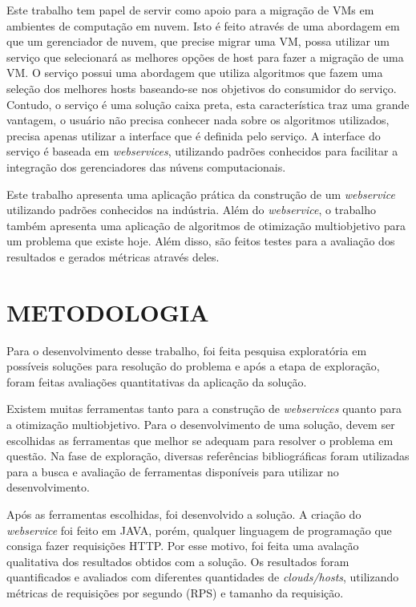 Este trabalho tem papel de servir como apoio para a migração de VMs em ambientes de computação em nuvem. 
Isto é feito através de uma abordagem em que um gerenciador de nuvem, que precise migrar uma VM, possa 
utilizar um serviço que selecionará as melhores opções de host para fazer a migração de uma VM. 
O serviço possui uma abordagem que utiliza algoritmos que fazem uma seleção dos melhores hosts baseando-se 
nos objetivos do consumidor do serviço. Contudo, o serviço é uma solução caixa preta, esta característica 
traz uma grande vantagem, o usuário não precisa conhecer nada sobre os algoritmos utilizados, 
precisa apenas utilizar a interface que é definida pelo serviço. A interface do serviço é baseada em
\textit{webservices}, utilizando padrões conhecidos para facilitar a integração dos gerenciadores
das núvens computacionais.

Este trabalho apresenta uma aplicação prática da construção de um \textit{webservice} utilizando padrões conhecidos
na indústria. Além do \textit{webservice}, o trabalho também apresenta uma aplicação de algoritmos de otimização multiobjetivo
para um problema que existe hoje. Além disso, são feitos testes para a avaliação dos resultados e gerados métricas através deles.

\section{METODOLOGIA}

Para o desenvolvimento desse trabalho, foi feita pesquisa exploratória em possíveis
soluções para resolução do problema e após a etapa de exploração, foram feitas
avaliações quantitativas da aplicação da solução.

Existem muitas ferramentas tanto para a construção de \textit{webservices} quanto
para a otimização multiobjetivo. Para o desenvolvimento de uma solução, devem 
ser escolhidas as ferramentas que melhor se adequam para resolver o problema em questão.
Na fase de exploração, diversas referências bibliográficas foram utilizadas para 
a busca e avaliação de ferramentas disponíveis para utilizar no desenvolvimento. 

Após as ferramentas escolhidas, foi desenvolvido a solução. A criação do \textit{webservice} foi 
feito em JAVA, porém, qualquer linguagem de programação que consiga fazer requisições HTTP.
Por esse motivo, foi feita uma avalação qualitativa dos resultados obtidos com a solução.
Os resultados foram quantificados e avaliados com diferentes quantidades de \textit{clouds/hosts},
utilizando métricas de requisições por segundo (RPS) e tamanho da requisição.

